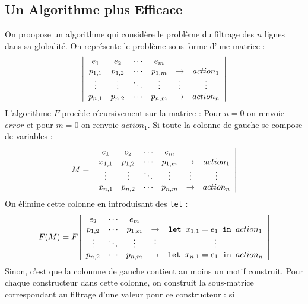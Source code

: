\documentclass{cours}
\begin{document}
\subsection{Un Algorithme plus Efficace}
On proopose un algorithme qui considère le problème du filtrage des $n$ lignes dans sa globalité. On représente le problème sous forme d'une matrice : 
\[
    \left|\begin{array}{cccccc}
        e_{1} & e_{2} & \cdots & e_{m} & &\\
        p_{1, 1} & p_{1, 2} & \cdots & p_{1, m} & \rightarrow & action_{1}\\
        \vdots & \vdots & \ddots & \vdots & \vdots & \vdots\\
        p_{n, 1} & p_{n, 2} & \cdots & p_{n, m} & \rightarrow & action_{n}\\
    \end{array}\right|
\]
L'algorithme $F$ procède récursivement sur la matrice : 
Pour $n = 0$ on renvoie $error$ et pour $m = 0$ on renvoie $action_{1}$.
Si toute la colonne de gauche se compose de variables : 
\[
    M = \left|\begin{array}{cccccc}
        e_{1} & e_{2} & \cdots & e_{m} & &\\
        x_{1, 1} & p_{1, 2} & \cdots & p_{1, m} & \rightarrow & action_{1}\\
        \vdots & \vdots & \ddots & \vdots & \vdots & \vdots\\
        x_{n, 1} & p_{n, 2} & \cdots & p_{n, m} & \rightarrow & action_{n}\\
    \end{array}\right|   
\]
On élimine cette colonne en introduisant des \texttt{let} : 
\[
    F(M) = F \left|\begin{array}{ccccc}
        e_{2} & \cdots & e_{m} & &\\
        p_{1, 2} & \cdots & p_{1, m} & \rightarrow & \texttt{let } x_{1,1} = e_{1} \texttt{ in }{action_{1}}\\
        \vdots & \ddots & \vdots & \vdots & \vdots\\
        p_{n, 2} & \cdots & p_{n, m} & \rightarrow & \texttt{let } x_{n,1} = e_{1} \texttt{ in }{action_{n}}\\
    \end{array}\right| 
\]
Sinon, c'est que la colonnne de gauche contient au moins un motif construit. Pour chaque constructeur dans cette colonne, on construit la sous-matrice correspondant au filtrage d'une valeur pour ce constructeur : si
\end{document}
